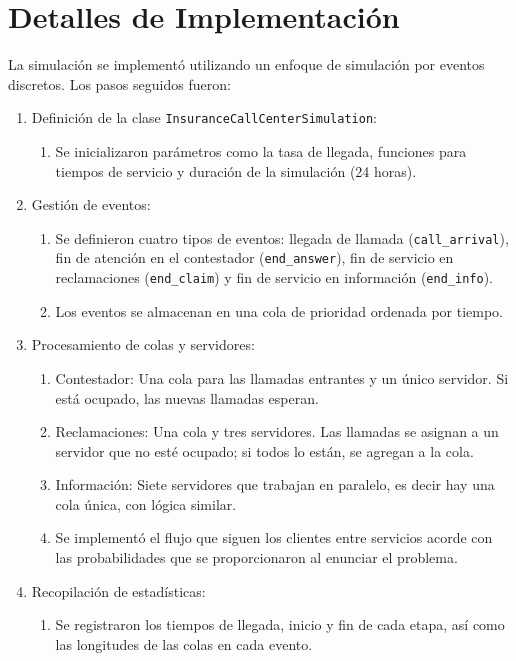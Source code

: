 \documentclass[12pt]{article}
\begin{document}
\section{Detalles de Implementación}
La simulación se implementó utilizando un enfoque de simulación por eventos discretos. Los pasos seguidos fueron:
\begin{enumerate}
    \item Definición de la clase \texttt{InsuranceCallCenterSimulation}:
    \begin{enumerate}
        \item Se inicializaron parámetros como la tasa de llegada, funciones para tiempos de servicio y duración de la simulación (24 horas).
    \end{enumerate}
    \item Gestión de eventos:
    \begin{enumerate}
        \item Se definieron cuatro tipos de eventos: llegada de llamada (\texttt{call\_arrival}), fin de atención en el contestador (\texttt{end\_answer}), fin de servicio en reclamaciones (\texttt{end\_claim}) y fin de servicio en información (\texttt{end\_info}).
        \item Los eventos se almacenan en una cola de prioridad ordenada por tiempo.
    \end{enumerate}
    \item Procesamiento de colas y servidores:
    \begin{enumerate}
        \item Contestador: Una cola para las llamadas entrantes y un único servidor. Si está ocupado, las nuevas llamadas esperan.
        \item Reclamaciones: Una cola y tres servidores. Las llamadas se asignan a un servidor que no esté ocupado; si todos lo están, se agregan a la cola.
        \item Información: Siete servidores que trabajan en paralelo, es decir hay una cola única, con lógica similar.
        \item Se implementó el flujo que siguen los clientes entre servicios acorde con las probabilidades que se proporcionaron al enunciar el problema.
    \end{enumerate}
    \item Recopilación de estadísticas:
    \begin{enumerate}
        \item Se registraron los tiempos de llegada, inicio y fin de cada etapa, así como las longitudes de las colas en cada evento.

\end{enumerate}
\end{enumerate}
\end{document}
